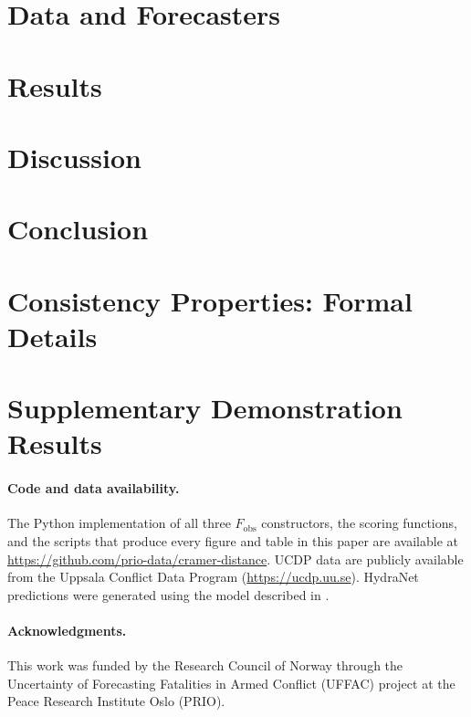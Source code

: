 \documentclass[11pt,a4paper]{article}
\begin{document}
\section{Data and Forecasters}


\section{Results}


\section{Discussion}


\section{Conclusion}


\appendix

\section{Consistency Properties: Formal Details}
\label{sec:appendix_consistency}


\section{Supplementary Demonstration Results}
\label{sec:appendix_demo}


\paragraph{Code and data availability.}
The Python implementation of all three $F_\text{obs}$ constructors, the scoring functions, and the scripts that produce every figure and table in this paper are available at \url{https://github.com/prio-data/cramer-distance}. UCDP data are publicly available from the Uppsala Conflict Data Program (\url{https://ucdp.uu.se}). HydraNet predictions were generated using the model described in \citet{VonDerMaase2025hydranet}.

\paragraph{Acknowledgments.}
This work was funded by the Research Council of Norway through the Uncertainty of Forecasting Fatalities in Armed Conflict (UFFAC) project at the Peace Research Institute Oslo (PRIO).



\end{document}
